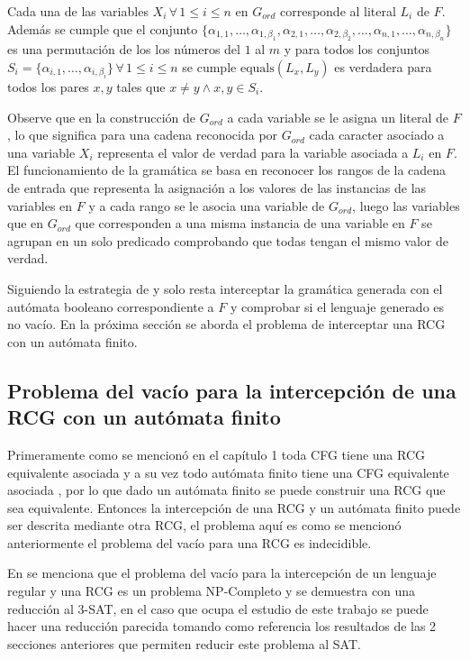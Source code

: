 Cada una de las variables $X_i\,\forall\,1\leq i\leq n$ en $G_{ord}$ corresponde al literal $L_i$ de $F$.
Además se cumple que el conjunto $\{\alpha_{1,1},\ldots,\alpha_{1,\beta_1},\alpha_{2,1},\ldots,
    \alpha_{2,\beta_2},\ldots,\alpha_{n,1},\ldots,\alpha_{n,\beta_n}\}$ es una permutación de los los números del
$1$ al $m$ y para todos los conjuntos $S_i=\{\alpha_{i,1},\ldots,\alpha_{i,\beta_i}\}\,\forall\,1\leq i\leq n$ se cumple
$\text{equals}(L_x,L_y)$ es verdadera para todos los pares $x, y$ tales que $x\neq y \wedge x,y\in S_i$.

Observe que en la construcción de $G_{ord}$ a cada variable se le asigna un literal de $F$, lo que significa
para una cadena reconocida por $G_{ord}$ cada caracter asociado a una variable $X_i$ representa el valor de verdad
para la variable asociada a $L_i$ en $F$. El funcionamiento de la gramática se basa en reconocer los rangos de la cadena
de entrada que representa la asignación a los valores de las instancias de las variables en $F$ y a cada rango se le asocia
una variable de $G_{ord}$, luego las variables que en $G_{ord}$ que corresponden a una misma instancia de una variable en
$F$ se agrupan en un solo predicado comprobando que todas tengan el mismo valor de verdad.

Siguiendo la estrategia de \cite{aCFSAT} y \cite{aSRCSAT} solo resta interceptar la gramática generada con el autómata
booleano correspondiente a $F$ y comprobar si el lenguaje generado es no vacío. En la próxima sección se aborda el problema de interceptar una RCG con un autómata finito.

\subsection{Problema del vacío para la intercepción de una RCG con un autómata finito}

Primeramente como se mencionó en el capítulo 1 toda CFG tiene una RCG equivalente asociada y a su vez todo autómata finito tiene una
CFG equivalente asociada \cite{authomataTheory}, por lo que dado un autómata finito se puede construir una RCG que sea equivalente.
Entonces la intercepción de una RCG y un autómata finito puede ser descrita mediante otra RCG, el problema aquí es como se mencionó
anteriormente el problema del vacío para una RCG es indecidible.

En \cite{propertiesRCGBib1} se menciona que el problema del vacío para la intercepción de un lenguaje regular y una RCG es un
problema NP-Completo y se demuestra con una reducción al 3-SAT, en el caso que ocupa el estudio de este trabajo se puede
hacer una reducción parecida tomando como referencia los resultados de las 2 secciones anteriores que permiten reducir este problema
al SAT.

